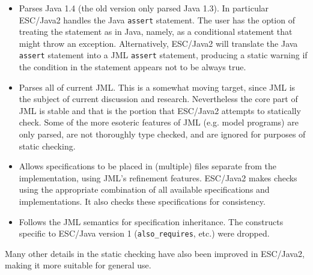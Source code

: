 \begin{itemize}
\item Parses Java 1.4 (the old version only parsed Java 1.3). 
  In particular ESC/Java2 handles the Java
  \verb$assert$ statement.  The user has the option of treating the
  statement as in Java, namely, as a conditional statement that
  might throw an exception.  Alternatively, ESC/Java2 will translate
  the Java \verb$assert$ statement into a JML \verb$assert$ statement,
  producing a static warning if the condition in the
  statement appears not to be always true.
\item Parses all of current JML.  This is a somewhat moving target,
  since JML is the subject of current discussion and research.
  Nevertheless the core part of JML is stable and that is the portion
  that ESC/Java2 attempts to statically check.  Some
  of the more esoteric features of JML (e.g. model programs)
  are only parsed, are not thoroughly type checked, and are ignored for
  purposes of static checking.
\item Allows specifications to be placed in (multiple) files separate from the
  implementation, using JML's refinement features.  ESC/Java2 makes checks
  using the appropriate combination of all available specifications and
  implementations.  It also checks these specifications for consistency.
\item Follows the JML semantics for specification inheritance.
  The constructs specific to ESC/Java version 1
  (\verb$also_requires$, etc.)
  were dropped.
\end{itemize}

Many other details in the static checking have also been improved in
ESC/Java2, making it more suitable for general use.


